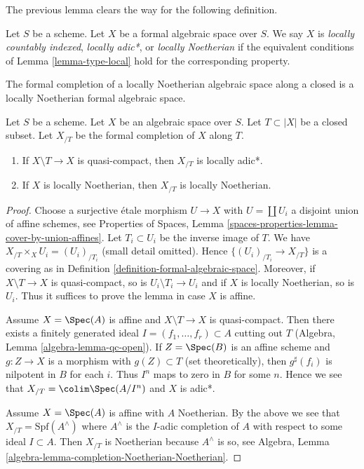 \noindent
The previous lemma clears the way for the following definition.

\begin{definition}
\label{definition-types-formal-algebraic-spaces}
Let $S$ be a scheme. Let $X$ be a formal algebraic space over $S$.
We say $X$ is {\it locally countably indexed},
{\it locally adic*}, or {\it locally Noetherian}
if the equivalent conditions of Lemma \ref{lemma-type-local}
hold for the corresponding property.
\end{definition}

\noindent
The formal completion of a locally Noetherian algebraic space
along a closed is a locally Noetherian formal algebraic space.

\begin{lemma}
\label{lemma-formal-completion-types}
Let $S$ be a scheme. Let $X$ be an algebraic space over $S$.
Let $T \subset |X|$ be a closed subset. Let $X_{/T}$ be the
formal completion of $X$ along $T$.
\begin{enumerate}
\item If $X \setminus T \to X$ is quasi-compact,
then $X_{/T}$ is locally adic*.
\item If $X$ is locally Noetherian, then $X_{/T}$ is locally
Noetherian.
\end{enumerate}
\end{lemma}

\begin{proof}
Choose a surjective \'etale morphism $U \to X$ with $U = \coprod U_i$
a disjoint union of affine schemes, see Properties of Spaces, Lemma
\ref{spaces-properties-lemma-cover-by-union-affines}.
Let $T_i \subset U_i$ be the inverse image of $T$.
We have $X_{/T} \times_X U_i = (U_i)_{/T_i}$ (small detail omitted).
Hence $\{(U_i)_{/T_i} \to X_{/T}\}$ is a covering as in
Definition \ref{definition-formal-algebraic-space}.
Moreover, if $X \setminus T \to X$ is quasi-compact, so is
$U_i \setminus T_i \to U_i$ and if $X$ is locally Noetherian, so is
$U_i$. Thus it suffices to prove the lemma in case $X$ is affine.

\medskip\noindent
Assume $X = \Spec(A)$ is affine and $X \setminus T \to X$ is quasi-compact.
Then there exists a finitely generated ideal
$I = (f_1, \ldots, f_r) \subset A$ cutting out $T$
(Algebra, Lemma \ref{algebra-lemma-qc-open}).
If $Z = \Spec(B)$ is an affine scheme and $g : Z \to X$ is
a morphism with $g(Z) \subset T$ (set theoretically), then
$g^\sharp(f_i)$ is nilpotent in $B$ for each $i$. Thus
$I^n$ maps to zero in $B$ for some $n$. Hence we see that
$X_{/T} = \colim \Spec(A/I^n)$ and $X$ is adic*.

\medskip\noindent
Assume $X = \Spec(A)$ is affine with $A$ Noetherian. By the above
we see that $X_{/T} = \text{Spf}(A^\wedge)$ where $A^\wedge$
is the $I$-adic completion of $A$ with respect to some ideal
$I \subset A$. Then $X_{/T}$ is Noetherian because
$A^\wedge$ is so, see
Algebra, Lemma \ref{algebra-lemma-completion-Noetherian-Noetherian}.
\end{proof}





